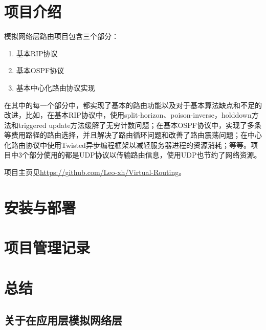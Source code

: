 \documentclass[15pt]{ctexart}
\begin{document}

\tableofcontents
\newpage
\section{项目介绍} %
\label{sec:项目介绍}
	模拟网络层路由项目包含三个部分：
	\begin{enumerate}
		\item 基本RIP协议
		\item 基本OSPF协议
		\item 基本中心化路由协议实现
	\end{enumerate}
	\par 在其中的每一个部分中，都实现了基本的路由功能以及对于基本算法缺点和不足的改进，比如，在基本RIP协议中，使用split-horizon、poison-inverse，holddown方法和triggered update方法缓解了无穷计数问题；在基本OSPF协议中，实现了多条等费用路径的路由选择，并且解决了路由循环问题和改善了路由震荡问题；在中心化路由协议中使用Twisted异步编程框架以减轻服务器进程的资源消耗；等等。项目中3个部分使用的都是UDP协议以传输路由信息，使用UDP也节约了网络资源。
	\par 项目主页见\url{https://github.com/Leo-xh/Virtual-Routing}。




\section{安装与部署} %
\label{sec:安装与部署}


\section{项目管理记录} %
\label{sec:项目管理记录}


\section{总结} %
\label{sec:总结}
	\subsection{关于在应用层模拟网络层} %
	\label{sub:关于在应用层模拟网络层协议}
	
\end{document}
